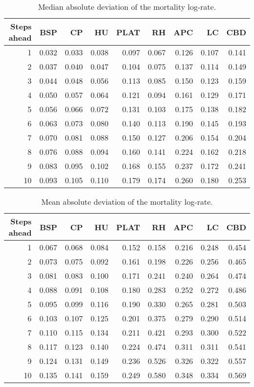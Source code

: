 % 
\begin{table}[ht]
\centering
\begin{tabular}{rrrrrrrrr}
  \hline
Steps ahead & BSP & CP & HU & PLAT & RH & APC & LC & CBD \\ 
  \hline
   1 & 0.032 & 0.033 & 0.038 & 0.097 & 0.067 & 0.126 & 0.107 & 0.141 \\ 
     2 & 0.037 & 0.040 & 0.047 & 0.104 & 0.075 & 0.137 & 0.114 & 0.149 \\ 
     3 & 0.044 & 0.048 & 0.056 & 0.113 & 0.085 & 0.150 & 0.123 & 0.159 \\ 
     4 & 0.050 & 0.057 & 0.064 & 0.121 & 0.094 & 0.161 & 0.129 & 0.171 \\ 
     5 & 0.056 & 0.066 & 0.072 & 0.131 & 0.103 & 0.175 & 0.138 & 0.182 \\ 
     6 & 0.063 & 0.073 & 0.080 & 0.140 & 0.113 & 0.190 & 0.145 & 0.193 \\ 
     7 & 0.070 & 0.081 & 0.088 & 0.150 & 0.127 & 0.206 & 0.154 & 0.204 \\ 
     8 & 0.076 & 0.088 & 0.094 & 0.160 & 0.141 & 0.224 & 0.162 & 0.218 \\ 
     9 & 0.083 & 0.095 & 0.102 & 0.168 & 0.155 & 0.237 & 0.172 & 0.241 \\ 
    10 & 0.093 & 0.105 & 0.110 & 0.179 & 0.174 & 0.260 & 0.180 & 0.253 \\ 
   \hline
\end{tabular}
\caption{Median absolute deviation of the mortality log-rate.} 
\end{table}
% 
\begin{table}[ht]
\centering
\begin{tabular}{rrrrrrrrr}
  \hline
Steps ahead & BSP & CP & HU & PLAT & RH & APC & LC & CBD \\ 
  \hline
   1 & 0.067 & 0.068 & 0.084 & 0.152 & 0.158 & 0.216 & 0.248 & 0.454 \\ 
     2 & 0.073 & 0.075 & 0.092 & 0.161 & 0.198 & 0.226 & 0.256 & 0.465 \\ 
     3 & 0.081 & 0.083 & 0.100 & 0.171 & 0.241 & 0.240 & 0.264 & 0.474 \\ 
     4 & 0.088 & 0.091 & 0.108 & 0.180 & 0.283 & 0.252 & 0.272 & 0.486 \\ 
     5 & 0.095 & 0.099 & 0.116 & 0.190 & 0.330 & 0.265 & 0.281 & 0.503 \\ 
     6 & 0.103 & 0.107 & 0.125 & 0.201 & 0.375 & 0.279 & 0.290 & 0.514 \\ 
     7 & 0.110 & 0.115 & 0.134 & 0.211 & 0.421 & 0.293 & 0.300 & 0.522 \\ 
     8 & 0.117 & 0.123 & 0.140 & 0.224 & 0.474 & 0.311 & 0.311 & 0.541 \\ 
     9 & 0.124 & 0.131 & 0.149 & 0.236 & 0.526 & 0.326 & 0.322 & 0.557 \\ 
    10 & 0.135 & 0.141 & 0.159 & 0.249 & 0.580 & 0.348 & 0.334 & 0.569 \\ 
   \hline
\end{tabular}
\caption{Mean absolute deviation of the mortality log-rate.} 
\end{table}

